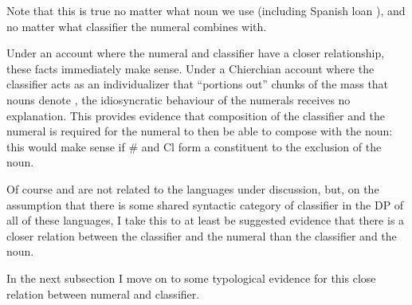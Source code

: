 \documentclass[output=paper
,modfonts
,nonflat]{langsci/langscibook}
\begin{document}
\begin{minipage}{.5\linewidth}

\ea \label{ex:hall:46}

\z
\z

\end{minipage}
\begin{minipage}{.5\linewidth}

\ea \label{ex:hall:47}

\z
\z
\end{minipage} \vspace{0.2cm}

Note that this is true no matter what noun we use (including Spanish loan ), and no matter what classifier the numeral combines with. 

Under an account where the numeral and classifier have a closer relationship, these facts immediately make sense. Under a Chierchian account where the classifier acts as an individualizer that ``portions out'' chunks of the mass that nouns denote \citep{Chierchia1998b}, the idiosyncratic behaviour of the numerals receives no explanation. This provides evidence that composition of the classifier and the numeral is required for the numeral to then be able to compose with the noun: this would make sense if \# and Cl form a constituent to the exclusion of the noun.

Of course  and  are not related to the languages under discussion, but, on the assumption that there is some shared syntactic category of classifier in the DP of all of these languages, I take this to at least be suggested evidence that there is a closer relation between the classifier and the numeral than the classifier and the noun. 

In the next subsection I move on to some typological evidence for this close relation between numeral and classifier. 
\end{document}
